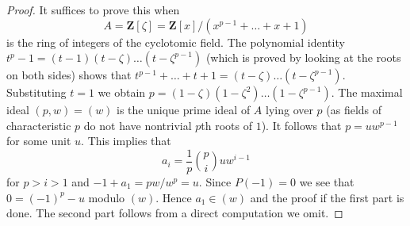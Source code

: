\documentclass[10pt,a4paper]{amsart}
\theoremstyle{plain}
\theoremstyle{definition}
\theoremstyle{remark}
\numberwithin{equation}{subsection}
\begin{document}
\begin{proof}
It suffices to prove this when
$$
A = \mathbf{Z}[\zeta] = \mathbf{Z}[x]/(x^{p - 1} + \ldots + x + 1)
$$
is the ring of integers of the cyclotomic field. The polynomial identity
$t^p - 1 = (t - 1)(t - \zeta) \ldots (t - \zeta^{p - 1})$
(which is proved by looking at the roots on both sides)
shows that
$t^{p - 1} + \ldots + t + 1 = (t - \zeta) \ldots (t - \zeta^{p - 1})$.
Substituting $t = 1$ we obtain
$p = (1 - \zeta)(1 - \zeta^2) \ldots (1 - \zeta^{p - 1})$.
The maximal ideal $(p, w) = (w)$ is the unique prime ideal of $A$
lying over $p$ (as fields of characteristic $p$ do not have nontrivial
$p$th roots of $1$). It follows that $p = u w^{p - 1}$ for some unit $u$.
This implies that
$$
a_i = \frac{1}{p} {p \choose i} u w^{i - 1}
$$
for $p > i > 1$ and $- 1 + a_1 = pw/w^p = u$. Since $P(-1) = 0$ we
see that $0 = (-1)^p - u$ modulo $(w)$. Hence $a_1 \in (w)$ and the
proof if the first part is done. The second part follows from a direct
computation we omit.
\end{proof}
\end{document}
